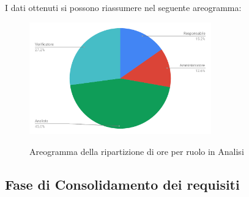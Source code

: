 I dati ottenuti si possono riassumere nel seguente areogramma:
\begin{figure}[H] 
			\centering 
				\includegraphics[width=0.7\textwidth]{res/images/areogramma_analisi.pdf}\\
				\caption{Areogramma della ripartizione di ore per ruolo in Analisi}
			\label{AreogrammaAnalisi}
\end{figure}

\subsection{Fase di Consolidamento dei requisiti}
